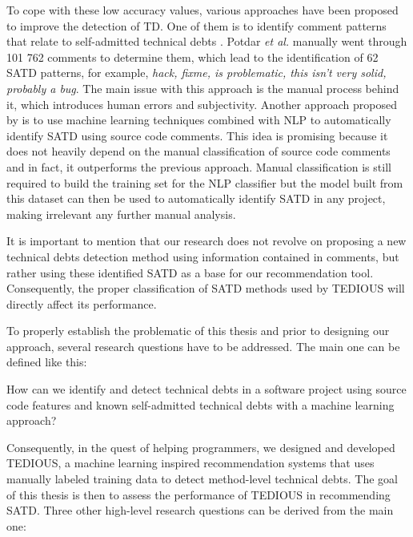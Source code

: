 To cope with these low accuracy values, various approaches have been proposed to improve the detection of \ac{TD}. One of them is to identify comment patterns that relate to self-admitted technical debts \citep{PotdarS14}. Potdar \emph{et al.} manually went through 101 762 comments to determine them, which lead to the identification of 62 \ac{SATD} patterns, for example, \emph{hack, fixme, is problematic, this isn't very solid, probably a bug}. The main issue with this approach is the manual process behind it, which introduces human errors and subjectivity. Another approach proposed by \citet{MaldonadoNLP} is to use machine learning techniques combined with \ac{NLP} to automatically identify \ac{SATD} using source code comments. This idea is promising because it does not heavily depend on the manual classification of source code comments and in fact, it outperforms the previous approach. Manual classification is still required to build the training set for the NLP classifier but the model built from this dataset can then be used to automatically identify \ac{SATD} in any project, making irrelevant any further manual analysis. \par

It is important to mention that our research does not revolve on proposing a new technical debts detection method using information contained in comments, but rather using these identified SATD as a base for our recommendation tool. Consequently, the proper classification of \ac{SATD} methods used by \ac{TEDIOUS} will directly affect its performance. 

To properly establish the problematic of this thesis and prior to designing our approach, several research questions have to be addressed. The main one can be defined like this:  \par

\begin{center}
\begin{framed}
	\noindent How can we identify and detect technical debts in a software project using source code features and known self-admitted technical debts with a machine learning approach?
\end{framed}
\end{center}

Consequently, in the quest of helping programmers, we designed and developed TEDIOUS, a machine learning inspired recommendation systems that uses manually labeled training data to detect method-level technical debts. The goal of this thesis is then to assess the performance of TEDIOUS in recommending SATD. Three other high-level research questions can be derived from the main one:

